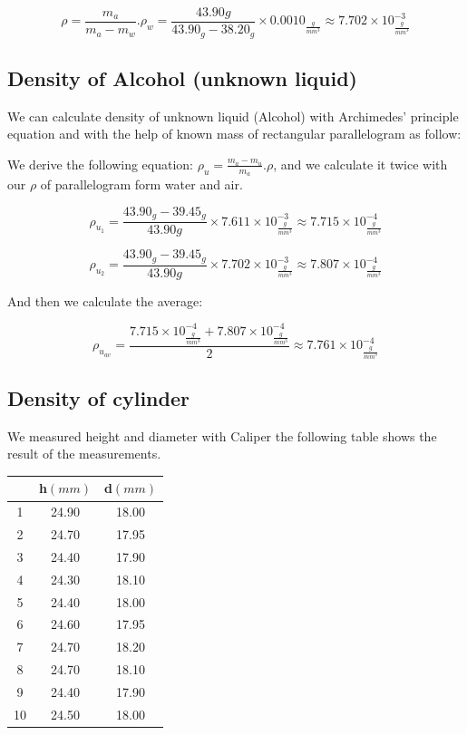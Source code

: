 \documentclass[a4paper, 12pt]{article}
\begin{document}
\[
\rho = \frac{m_{a}}{m_{a}-m_{w}}.\rho_{w} = \frac{43.90g}{43.90_{g} - 38.20_{g}} \times 0.0010_{\frac{g}{mm^{3}}} \approx 7.702\times10^{-3}_{\frac{g}{mm^{3}}}
\]


\subsection{Density of Alcohol (unknown liquid)}

We can calculate density of unknown liquid (Alcohol) with Archimedes’ principle equation and with the help of known mass of rectangular parallelogram as follow:

We derive the following equation: \(\rho_{u} = \frac{m_{a}-m_{u}}{m_{a}} . \rho \), and we calculate it twice with our \(\rho\) of parallelogram form water and air. 


\[\rho_{u_{1}} = \frac{43.90_{g} - 39.45_{g} }{43.90{g}} \times 7.611\times10^{-3}_{\frac{g}{mm^{3}}} \approx  7.715\times10^{-4}_{\frac{g}{mm^{3}}} \]

\[\rho_{u_{2}} = \frac{43.90_{g} - 39.45_{g} }{43.90{g}} \times 7.702\times10^{-3}_{\frac{g}{mm^{3}}} \approx 7.807\times10^{-4}_{\frac{g}{mm^{3}}} \]


And then we calculate the average:

\[\rho_{u_{av}} = \frac{7.715\times10^{-4}_{\frac{g}{mm^{3}}} + 7.807\times10^{-4}_{\frac{g}{mm^{3}}} }{2} \approx 7.761\times10^{-4}_{\frac{g}{mm^{3}}}  \]


\subsection{Density of cylinder}

We measured height and diameter with Caliper the following table shows the result of the measurements.

\begin{center}
	\begin{tabular}{||c c c||} 
		\hline
		&  h\((mm)\) & d\((mm)\)  \\ [0.5ex] 
		\hline\hline
		1 & 24.90 & 18.00 \\ 
		\hline
		2 & 24.70 & 17.95 \\
		\hline
		3 & 24.40 & 17.90 \\
		\hline
		4 & 24.30 & 18.10 \\
		\hline
		5 & 24.40 & 18.00 \\
		\hline
		6 & 24.60 & 17.95 \\
		\hline
		7 & 24.70 & 18.20 \\
		\hline
		8 & 24.70 & 18.10 \\
		\hline
		9 & 24.40 & 17.90  \\
		\hline
		10 & 24.50 & 18.00 \\ [1ex] 
		\hline
	\end{tabular}
\end{center}
\end{document}
